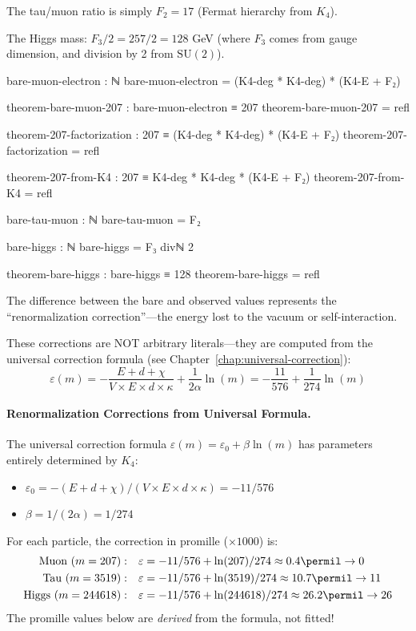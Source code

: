 \documentclass[11pt,a4paper]{book}
\begin{document}
The tau/muon ratio is simply $F_2 = 17$ (Fermat hierarchy from $K_4$).

The Higgs mass: $F_3/2 = 257/2 = 128$ GeV (where $F_3$ comes from gauge dimension, and division by 2 from $\mathrm{SU}(2)$).

\begin{code}
bare-muon-electron : ℕ
bare-muon-electron = (K4-deg * K4-deg) * (K4-E + F₂)

theorem-bare-muon-207 : bare-muon-electron ≡ 207
theorem-bare-muon-207 = refl

theorem-207-factorization : 207 ≡ (K4-deg * K4-deg) * (K4-E + F₂)
theorem-207-factorization = refl

theorem-207-from-K4 : 207 ≡ K4-deg * K4-deg * (K4-E + F₂)
theorem-207-from-K4 = refl

bare-tau-muon : ℕ
bare-tau-muon = F₂

bare-higgs : ℕ
bare-higgs = F₃ divℕ 2

theorem-bare-higgs : bare-higgs ≡ 128
theorem-bare-higgs = refl

\end{code}

The difference between the bare and observed values represents the ``renormalization correction''---the energy lost to the vacuum or self-interaction. 

These corrections are NOT arbitrary literals---they are computed from the universal correction formula (see Chapter~\ref{chap:universal-correction}):
\[
\varepsilon(m) = -\frac{E + d + \chi}{V \times E \times d \times \kappa} + \frac{1}{2\alpha} \ln(m) = -\frac{11}{576} + \frac{1}{274} \ln(m)
\]

\paragraph{Renormalization Corrections from Universal Formula.}
The universal correction formula $\varepsilon(m) = \varepsilon_0 + \beta \ln(m)$ has parameters entirely determined by $K_4$:
\begin{itemize}
\item $\varepsilon_0 = -(E + d + \chi)/(V \times E \times d \times \kappa) = -11/576$
\item $\beta = 1/(2\alpha) = 1/274$
\end{itemize}
For each particle, the correction in promille ($\times 1000$) is:
\begin{align*}
\text{Muon } (m=207): \quad &\varepsilon = -11/576 + \ln(207)/274 \approx 0.4\permil \to 0 \\
\text{Tau } (m=3519): \quad &\varepsilon = -11/576 + \ln(3519)/274 \approx 10.7\permil \to 11 \\
\text{Higgs } (m=244618): \quad &\varepsilon = -11/576 + \ln(244618)/274 \approx 26.2\permil \to 26
\end{align*}
The promille values below are \emph{derived} from the formula, not fitted!
\end{document}
